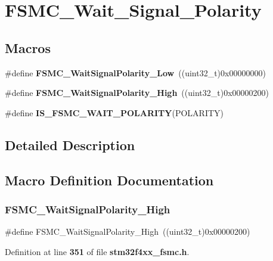 \section{F\+S\+M\+C\+\_\+\+Wait\+\_\+\+Signal\+\_\+\+Polarity}
\label{group__FSMC__Wait__Signal__Polarity}
\subsection*{Macros}
\begin{DoxyCompactItemize}
\item 
\#define \textbf{ F\+S\+M\+C\+\_\+\+Wait\+Signal\+Polarity\+\_\+\+Low}~((uint32\+\_\+t)0x00000000)
\item 
\#define \textbf{ F\+S\+M\+C\+\_\+\+Wait\+Signal\+Polarity\+\_\+\+High}~((uint32\+\_\+t)0x00000200)
\item 
\#define \textbf{ I\+S\+\_\+\+F\+S\+M\+C\+\_\+\+W\+A\+I\+T\+\_\+\+P\+O\+L\+A\+R\+I\+TY}(P\+O\+L\+A\+R\+I\+TY)
\end{DoxyCompactItemize}


\subsection{Detailed Description}


\subsection{Macro Definition Documentation}
\mbox{\label{group__FSMC__Wait__Signal__Polarity_ga3418f29249a261edb1359d1bcdc43661}} 
\subsubsection{F\+S\+M\+C\+\_\+\+Wait\+Signal\+Polarity\+\_\+\+High}
{\footnotesize\ttfamily \#define F\+S\+M\+C\+\_\+\+Wait\+Signal\+Polarity\+\_\+\+High~((uint32\+\_\+t)0x00000200)}



Definition at line \textbf{ 351} of file \textbf{ stm32f4xx\+\_\+fsmc.\+h}.

